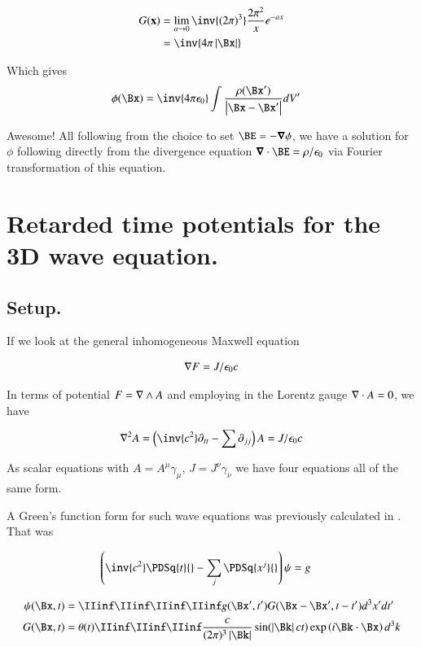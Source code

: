\begin{align*}
G(\mathbf{x})
&= \lim_{a \rightarrow 0} \inv{(2\pi)^3} \frac{2 \pi^2}{x} e^{ - a x } \\
&= \inv{4\pi\Abs{\Bx}}
\end{align*}

Which gives
\begin{align*}
\phi(\Bx) &= \inv{4\pi \epsilon_0} \int \frac{\rho(\Bx')}{\Abs{\Bx - \Bx'}} dV'
\end{align*}

Awesome!  All following from the choice to set $\BE = -\spacegrad \phi$, we have a solution for $\phi$ following directly
from the divergence equation $\spacegrad \cdot \BE = \rho/\epsilon_0$ via Fourier transformation of this equation.

\section{Retarded time potentials for the 3D wave equation. }

\subsection{Setup. }

If we look at the general inhomogeneous Maxwell equation

\begin{align}
\nabla F = J/\epsilon_0 c
\end{align}

In terms of potential $F = \nabla \wedge A$ and employing in the Lorentz gauge $\nabla \cdot A = 0$, we have

\begin{align}
\grad^2 A = \left(\inv{c^2} \partial_{tt} - \sum \partial_{jj}\right) A = J/\epsilon_0 c
\end{align}

As scalar equations with $A = A^\mu \gamma_\mu$, $J = J^\nu \gamma_\nu$ we have four equations all of the same form.

A Green's function form for such wave equations was previously calculated in .  That was

\begin{align}
\left( \inv{c^2} \PDSq{t}{} -\sum_j \PDSq{x^j}{} \right)\psi &= g
\end{align}

\begin{align}
{\psi}(\Bx, t) &= \IIinf \IIinf \IIinf \IIinf g(\Bx', t') G(\Bx - \Bx', t - t') d^3 x' dt' \\
G(\Bx, t) &= \theta(t) \IIinf \IIinf \IIinf \frac{c}{(2\pi)^3 \Abs{\Bk}} \sin( \Abs{\Bk} c t ) \exp\left( i \Bk \cdot \Bx \right) d^3 k
\end{align}


